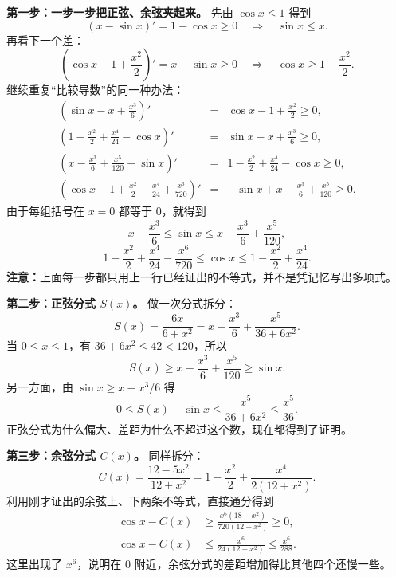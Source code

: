 \begin{proofbox}
\textbf{第一步：一步一步把正弦、余弦夹起来。}
先由 $\cos x\le1$ 得到
\[
(x-\sin x)'=1-\cos x\ge0
\quad\Longrightarrow\quad\sin x\le x.
\]
再看下一个差：
\[
\left(\cos x-1+\frac{x^2}{2}\right)'=x-\sin x\ge0
\quad\Longrightarrow\quad\cos x\ge1-\frac{x^2}{2}.
\]
继续重复“比较导数”的同一种办法：
\[
\begin{array}{rcl}
\left(\sin x-x+\frac{x^3}{6}\right)'&=&\cos x-1+\frac{x^2}{2}\ge0,\\[2pt]
\left(1-\frac{x^2}{2}+\frac{x^4}{24}-\cos x\right)'&=&\sin x-x+\frac{x^3}{6}\ge0,\\[2pt]
\left(x-\frac{x^3}{6}+\frac{x^5}{120}-\sin x\right)'&=&1-\frac{x^2}{2}+\frac{x^4}{24}-\cos x\ge0,\\[2pt]
\left(\cos x-1+\frac{x^2}{2}-\frac{x^4}{24}+\frac{x^6}{720}\right)'&=&-\sin x+x-\frac{x^3}{6}+\frac{x^5}{120}\ge0.
\end{array}
\]
由于每组括号在 $x=0$ 都等于 $0$，就得到
\[
\boxed{x-\frac{x^3}{6}\le\sin x\le x-\frac{x^3}{6}+\frac{x^5}{120}},
\]
\[
\boxed{1-\frac{x^2}{2}+\frac{x^4}{24}-\frac{x^6}{720}
\le\cos x\le1-\frac{x^2}{2}+\frac{x^4}{24}}.
\]
\textbf{注意：}上面每一步都只用上一行已经证出的不等式，并不是凭记忆写出多项式。

\medskip
\textbf{第二步：正弦分式 $S(x)$。}
做一次分式拆分：
\[
S(x)=\frac{6x}{6+x^2}
=x-\frac{x^3}{6}+\frac{x^5}{36+6x^2}.
\]
当 $0\le x\le1$，有 $36+6x^2\le42<120$，所以
\[
S(x)\ge x-\frac{x^3}{6}+\frac{x^5}{120}\ge\sin x.
\]
另一方面，由 $\sin x\ge x-x^3/6$ 得
\[
\boxed{0\le S(x)-\sin x\le\frac{x^5}{36+6x^2}\le\frac{x^5}{36}}.
\]
正弦分式为什么偏大、差距为什么不超过这个数，现在都得到了证明。

\medskip
\textbf{第三步：余弦分式 $C(x)$。}
同样拆分：
\[
C(x)=\frac{12-5x^2}{12+x^2}
=1-\frac{x^2}{2}+\frac{x^4}{2(12+x^2)}.
\]
利用刚才证出的余弦上、下两条不等式，直接通分得到
\[
\begin{aligned}
\cos x-C(x)
&\ge\frac{x^6(18-x^2)}{720(12+x^2)}\ge0,\\[3pt]
\cos x-C(x)
&\le\frac{x^6}{24(12+x^2)}\le\boxed{\frac{x^6}{288}}.
\end{aligned}
\]
这里出现了 $x^6$，说明在 $0$ 附近，余弦分式的差距增加得比其他四个还慢一些。


\end{proofbox}
